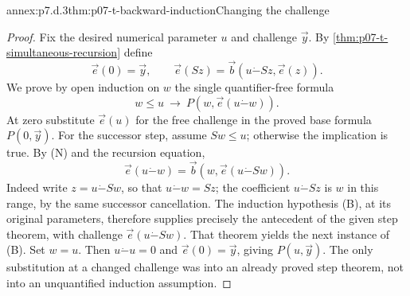 \begin{annexitem}{annex:p7.d.3}{thm:p07-t-backward-induction}{Changing the challenge}
\begin{proof}
Fix the desired numerical parameter \(u\) and challenge \(\vec y\).
By \cref{thm:p07-t-simultaneous-recursion} define
\[
 \vec e(0)=\vec y,\qquad
 \vec e(Sz)=\vec b(u\mathbin{\dot{-}}Sz,\vec e(z)).
\]
We prove by open induction on \(w\) the single quantifier-free formula
\[
 w\leq u\ \longrightarrow\
 P(w,\vec e(u\mathbin{\dot{-}}w)).
 \tag{B}
\]
At zero substitute \(\vec e(u)\) for the free challenge in the
proved base formula \(P(0,\vec y)\). For the successor step, assume
\(Sw\leq u\); otherwise the implication is true. By (N) and the
recursion equation,
\[
 \vec e(u\mathbin{\dot{-}}w)
 =\vec b(w,\vec e(u\mathbin{\dot{-}}Sw)).
\]
Indeed write \(z=u\mathbin{\dot{-}}Sw\), so that
\(u\mathbin{\dot{-}}w=Sz\); the coefficient
\(u\mathbin{\dot{-}}Sz\) is \(w\) in this range, by the same
successor cancellation. The induction hypothesis (B), at its original
parameters, therefore supplies precisely the antecedent of the given
step theorem, with challenge
\(\vec e(u\mathbin{\dot{-}}Sw)\). That theorem yields the next
instance of (B). Set \(w=u\). Then \(u\mathbin{\dot{-}}u=0\)
and \(\vec e(0)=\vec y\), giving \(P(u,\vec y)\).
The only substitution at a changed challenge was into an already proved
step theorem, not into an unquantified induction assumption.
\end{proof}
\end{annexitem}


